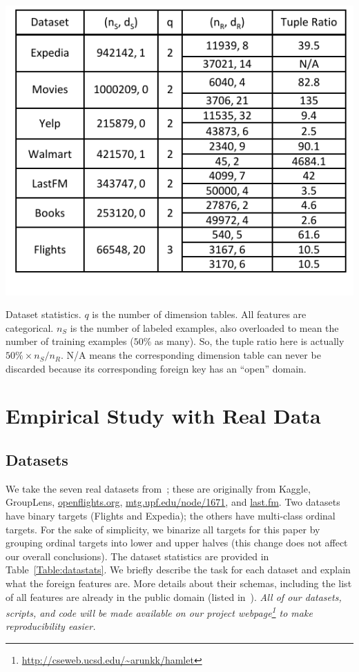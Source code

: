\documentclass{vldb}
\begin{document}
\begin{table}[t]
\centering
\includegraphics[width=0.99\linewidth]{table1.pdf}
\caption{Dataset statistics. $q$ is the number of dimension tables. All features are categorical. $n_S$ is the number of labeled examples, also 
overloaded to mean the number of training examples ($50\%$ as many). So, the tuple ratio here is actually $50\% \times n_S / n_R$. N/A means the 
corresponding dimension table can never be discarded because its corresponding foreign key has an ``open'' domain.
}
\label{Table:datastats}
\end{table}


\section{Empirical Study with Real Data}

\subsection{Datasets}
We take the seven real datasets from~\cite{hamlet}; these are originally from Kaggle, GroupLens, \url{openflights.org}, \url{mtg.upf.edu/node/1671}, and \url{last.fm}.
Two datasets have binary targets (Flights and Expedia); the others have multi-class ordinal targets. For the sake of simplicity, we binarize all targets 
for this paper by grouping ordinal targets into lower and upper halves (this change does not affect our overall conclusions). 
The dataset statistics are provided in Table~\ref{Table:datastats}. 
We briefly describe the task for each dataset and explain what the foreign features are. More details about their schemas, including the list 
of all features are already in the public domain (listed in~\cite{hamlet}). 
\textit{All of our datasets, scripts, and code will be made available on our project webpage\footnote{\url{http://cseweb.ucsd.edu/~arunkk/hamlet}} to make reproducibility easier.}
\end{document}

